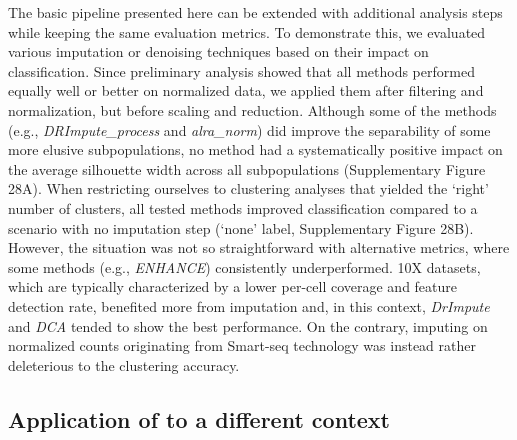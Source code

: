 \documentclass{bmcart}
\begin{document}
The basic pipeline presented here can be extended with additional analysis steps while keeping the same evaluation metrics. To demonstrate this, we evaluated various imputation or denoising techniques based on their impact on classification. Since preliminary analysis showed that all methods performed equally well or better on normalized data, we applied them after filtering and normalization, but before scaling and reduction. Although some of the methods (e.g., \textit{DRImpute\_process} and \textit{alra\_norm}) did improve the separability of some more elusive subpopulations, no method had a systematically positive impact on the average silhouette width across all subpopulations (Supplementary Figure 28A). When restricting ourselves to clustering analyses that yielded the `right' number of clusters, all tested methods improved classification  compared to a scenario with no imputation step (`none' label, Supplementary Figure 28B). However, the situation was not so straightforward with alternative metrics, where some methods (e.g., \textit{ENHANCE}) consistently underperformed. 10X datasets, which are typically characterized by a lower per-cell coverage and feature detection rate, benefited more from imputation and, in this context, \textit{DrImpute} and \textit{DCA} tended to show the best performance. On the contrary, imputing on normalized counts originating from Smart-seq technology was instead rather deleterious to the clustering accuracy. 

\subsection*{Application of  to a different context}
\end{document}
